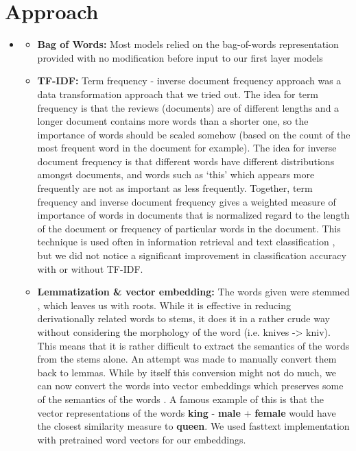 \section{Approach}
\medskip
\begin{itemize}

    \item {}
    \begin{itemize}
        \item \textbf{Bag of Words:} Most models relied on the bag-of-words representation provided with no modification before input to our first layer models
        \item \textbf{TF-IDF:} Term frequency - inverse document frequency approach was a data transformation approach that we tried out. The idea for term frequency is that the reviews (documents) are of different lengths and a longer document contains more words than a shorter one, so the importance of words should be scaled somehow (based on the count of the most frequent word in the document for example). The idea for inverse document frequency is that different words have different distributions amongst documents, and words such as `this' which appears more frequently are not as important as less frequently. Together, term frequency and inverse document frequency gives a weighted measure of importance of words in documents that is normalized regard to the length of the document or frequency of particular words in the document. This technique is used often in information retrieval and text classification \cite{tokunaga1994text,robertson2004understanding,salton1988term,ramos2003using}, but we did not notice a significant improvement in classification accuracy with or without TF-IDF.
        \item \textbf{Lemmatization \& vector embedding:} The words given were stemmed \cite{porter1980algorithm}, which leaves us with roots. While it is effective in reducing derivationally related words to stems, it does it in a rather crude way without considering the morphology of the word (i.e. knives -> kniv). This means that it is rather difficult to extract the semantics of the words from the stems alone. An attempt was made to manually convert them back to lemmas. While by itself this conversion might not do much, we can now convert the words into vector embeddings which preserves some of the semantics of the words \cite{bojanowski2016enriching}. A famous example of this is that the vector representations of the words \textbf{king} - \textbf{male} + \textbf{female} would have the closest similarity measure to \textbf{queen}. We used fasttext implementation with pretrained word vectors for our embeddings\cite{bojanowski2016enriching}.

\end{itemize}
\end{itemize}
